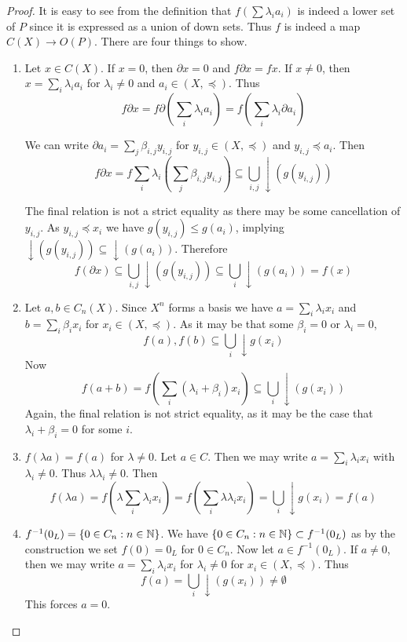 \begin{proof}


It is easy to see from the definition that $f(\sum \lambda_i a_i)$ is indeed a lower set of $P$ since it is expressed as a union of down sets.  Thus $f$ is indeed a map $C(X)\to O(P)$.  There are four things to show.

\begin{enumerate}
\item Let $x\in C(X)$. If $x=0$, then $\partial x =0$ and $f\partial x = fx$.  If $x\neq 0$, then $x = \sum_i \lambda_i a_i$ for $\lambda_i\neq 0$ and $a_i\in (X,\preceq)$.  Thus $$f\partial x = f\partial (\sum_i \lambda_i a_i) =  f (\sum_i \lambda_i \partial a_i) $$  

We can write $\partial a_i = \sum_j \beta_{i,j} y_{i,j}$ for $y_{i,j}\in (X,\preceq)$ and $y_{i,j}\preceq a_i$.  Then $$f\partial x = f \sum_i \lambda_i (\sum_j \beta_{i,j} y_{i,j}) \subseteq \bigcup_{i,j} \downarrow ( g(y_{i,j})) $$  

The final relation is not a strict equality as there may be some cancellation of $y_{i,j}$.  As $y_{i,j}\preceq x_i$ we have $g(y_{i,j})\leq g(a_i)$, implying $\downarrow (g(y_{i,j}))\subseteq \downarrow ( g(a_i))$.  Therefore $$f(\partial x)\subseteq  \bigcup_{i,j} \downarrow ( g(y_{i,j})) \subseteq \bigcup_i \downarrow( g(a_i)) = f(x)$$


\item Let $a,b\in C_n(X)$.  Since $X^n$ forms a basis we have $a = \sum_i \lambda_i x_i$ and $b=\sum_i \beta_i x_i$ for $x_i\in (X,\preceq)$.  As it may be that some $\beta_i=0$ or $\lambda_i=0$,  $$f(a),f(b)\subseteq \bigcup_i \downarrow g(x_i) $$  Now $$f(a+b) = f(\sum_i (\lambda_i+\beta_i)x_i) \subseteq \bigcup_i \downarrow(g(x_i))$$  Again, the final relation is not strict equality, as it may be the case that $\lambda_i+\beta_i=0$ for some $i$.  

\item $f(\lambda a) = f(a)$ for $\lambda\neq 0$. Let $a\in C$.  Then we may write $a = \sum_i \lambda_i x_i$ with $\lambda_i\neq 0$.  Thus $\lambda\lambda_i\neq 0$.  Then $$f(\lambda a) = f(\lambda \sum_i \lambda_i x_i) = f(\sum_i \lambda \lambda_i x_i) = \bigcup_i \downarrow g(x_i) = f(a)$$

\item  $f^{-1}(0_L) = \{0 \in C_n:n\in {\mathbb{N}}\}$.  We have $\{0\in C_n:n\in {\mathbb{N}}\}\subset f^{-1}(0_L)$ as by the construction we set $f(0)=0_L$ for $0\in C_n$.  Now let $a\in f^{-1}(0_L)$.  If $a\neq 0$, then we may write $a = \sum_i \lambda_i x_i$ for $\lambda_i\neq 0$ for $x_i\in (X,\preceq)$.  Thus $$f(a) = \bigcup_i \downarrow (g(x_i)) \neq \emptyset$$  This forces $a=0$.


\end{enumerate}
\end{proof}

